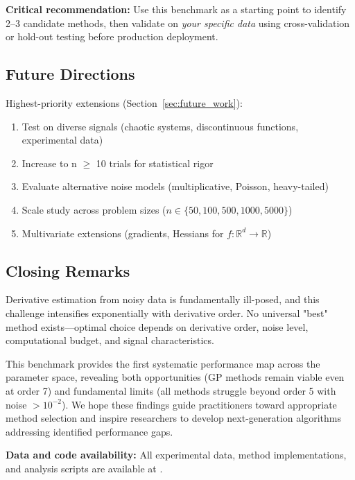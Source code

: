 \textbf{Critical recommendation:} Use this benchmark as a starting point to identify 2--3 candidate methods, then validate on \textit{your specific data} using cross-validation or hold-out testing before production deployment.

\subsection{Future Directions}

Highest-priority extensions (Section~\ref{sec:future_work}):
\begin{enumerate}
    \item Test on diverse signals (chaotic systems, discontinuous functions, experimental data)
    \item Increase to n $\geq$ 10 trials for statistical rigor
    \item Evaluate alternative noise models (multiplicative, Poisson, heavy-tailed)
    \item Scale study across problem sizes ($n \in \{50, 100, 500, 1000, 5000\}$)
    \item Multivariate extensions (gradients, Hessians for $f: \mathbb{R}^d \to \mathbb{R}$)
\end{enumerate}

\subsection{Closing Remarks}

Derivative estimation from noisy data is fundamentally ill-posed, and this challenge intensifies exponentially with derivative order. No universal "best" method exists—optimal choice depends on derivative order, noise level, computational budget, and signal characteristics.

This benchmark provides the first systematic performance map across the parameter space, revealing both opportunities (GP methods remain viable even at order 7) and fundamental limits (all methods struggle beyond order 5 with noise $> 10^{-2}$). We hope these findings guide practitioners toward appropriate method selection and inspire researchers to develop next-generation algorithms addressing identified performance gaps.

\textbf{Data and code availability:} All experimental data, method implementations, and analysis scripts are available at .
